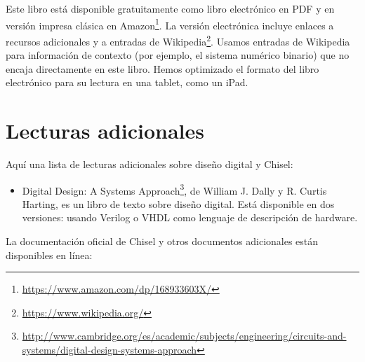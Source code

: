 \documentclass[%
    10pt,
    headinclude, footinclude=false,
    openright, %
    notitlepage,
    cleardoublepage=empty,
    headsepline,
    numbers=noenddot,
    bibliography=totoc, index=totoc,
    ]{scrbook}
\newcommand{\myref}[2]{\href{#1}{#2}}
\renewcommand{\myref}[2]{{#2}{\footnote{\url{#1}}}}
\begin{document}
Este libro está disponible gratuitamente como libro electrónico en PDF y en versión impresa clásica en
\myref{https://www.amazon.com/dp/168933603X/}{Amazon}.
La versión electrónica incluye enlaces a recursos adicionales
y a entradas de \myref{https://www.wikipedia.org/}{Wikipedia}.
Usamos entradas de Wikipedia para información de contexto (por ejemplo, el sistema numérico binario)
que no encaja directamente en este libro.
Hemos optimizado el formato del libro electrónico para su lectura en una tablet, como un iPad.

\section{Lecturas adicionales}

Aquí una lista de lecturas adicionales sobre diseño digital y Chisel:
\begin{itemize}
\item \myref{http://www.cambridge.org/es/academic/subjects/engineering/circuits-and-systems/digital-design-systems-approach}{Digital Design: A Systems Approach}, de William J. Dally y R. Curtis Harting,
es un libro de texto sobre diseño digital. Está disponible en dos versiones: usando Verilog o VHDL como lenguaje de descripción de hardware.
\end{itemize}

La documentación oficial de Chisel y otros documentos adicionales están disponibles en línea:
\end{document}
